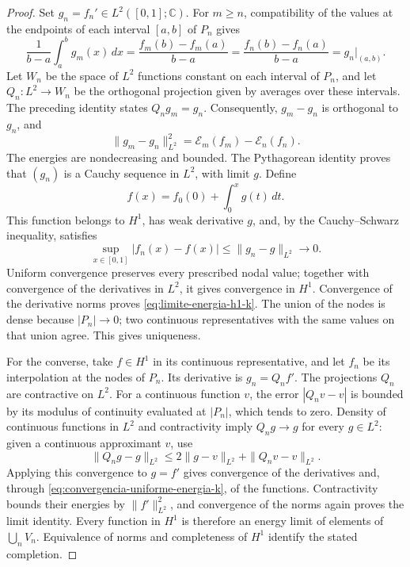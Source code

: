 \begin{proof}
Set \(g_n=f_n'\in L^2([0,1];\mathbb C)\). For \(m\geq n\),
compatibility of the values at the endpoints of each interval
\([a,b]\) of \(P_n\) gives
\[
 \frac1{b-a}\int_a^bg_m(x)\,dx
 =\frac{f_m(b)-f_m(a)}{b-a}
 =\frac{f_n(b)-f_n(a)}{b-a}
 =g_n\big|_{(a,b)}.
\]
Let \(W_n\) be the space of \(L^2\) functions constant on each
interval of \(P_n\), and let \(Q_n:L^2\to W_n\) be the orthogonal
projection given by averages over these intervals. The preceding
identity states \(Q_ng_m=g_n\). Consequently, \(g_m-g_n\) is
orthogonal to \(g_n\), and
\begin{equation}
 \|g_m-g_n\|_{L^2}^2
 =\mathcal E_m(f_m)-\mathcal E_n(f_n).
 \label{eq:pitagoras-gradientes-k}
\end{equation}
The energies are nondecreasing and bounded. The Pythagorean identity
proves that \((g_n)\) is a Cauchy sequence in \(L^2\), with
limit \(g\). Define
\[
 f(x)=f_0(0)+\int_0^xg(t)\,dt.
\]
This function belongs to \(H^1\), has weak derivative \(g\),
and, by the Cauchy--Schwarz inequality, satisfies
\begin{equation}
 \sup_{x\in[0,1]}|f_n(x)-f(x)|
 \leq\|g_n-g\|_{L^2}\longrightarrow0.
 \label{eq:convergencia-uniforme-energia-k}
\end{equation}
Uniform convergence preserves every prescribed nodal value; together
with convergence of the derivatives in \(L^2\), it gives convergence
in \(H^1\). Convergence of the derivative norms proves
\eqref{eq:limite-energia-h1-k}. The union of the nodes is dense
because \(|P_n|\to0\); two continuous representatives with the same
values on that union agree. This gives uniqueness.

For the converse, take \(f\in H^1\) in its continuous representative,
and let \(f_n\) be its interpolation at the nodes of \(P_n\).
Its derivative is \(g_n=Q_nf'\). The projections \(Q_n\) are
contractive on \(L^2\). For a continuous function \(v\), the
error \(|Q_nv-v|\) is bounded by its modulus of continuity evaluated
at \(|P_n|\), which tends to zero. Density of continuous functions
in \(L^2\) and contractivity imply \(Q_ng\to g\) for every
\(g\in L^2\): given a continuous approximant \(v\), use
\[
 \|Q_ng-g\|_{L^2}
 \leq 2\|g-v\|_{L^2}+\|Q_nv-v\|_{L^2}.
\]
Applying this convergence to \(g=f'\) gives convergence of the
derivatives and, through \eqref{eq:convergencia-uniforme-energia-k},
of the functions. Contractivity bounds their energies by
\(\|f'\|_{L^2}^2\), and convergence of the norms again proves
the limit identity. Every function in \(H^1\) is therefore an
energy limit of elements of \(\bigcup_nV_n\).
Equivalence of norms and completeness of \(H^1\) identify the
stated completion.
\end{proof}

